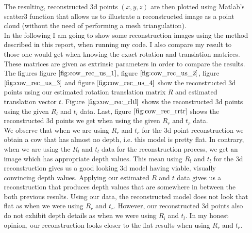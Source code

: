 \documentclass{paper}
\begin{document}
The resulting, reconstructed 3d points $(x,y,z)$ are then plotted using Matlab's scatter3 function that allows us to illustrate a reconstructed image as a point cloud (without the need of performing a mesh triangulation). \\

In the following I am going to show some reconstruction images using the method described in this report, when running my code. I also compare my result to those one would get when knowing the exact rotation and translation matrices. These matrices are given as extrinsic parameters in order to compare the results. \\

The figures figure $\ref{fig:cow_rec_us_1}$, figure $\ref{fig:cow_rec_us_2}$, figure $\ref{fig:cow_rec_us_3}$ and figure $\ref{fig:cow_rec_us_4}$ show the reconstructed 3d points using our estimated rotation translation matrix $R$ and estimated translation vector $t$. Figure $\ref{fig:cow_rec_rltl}$ shows the reconstructed 3d points using the given $R_l$ and $t_l$ data. Last, figure $\ref{fig:cow_rec_rrtr}$ shows the reconstructed 3d points we get when using the given $R_r$ and $t_r$ data. \\

We observe that when we are using $R_r$ and $t_r$ for the 3d point reconstruction we obtain a cow that has almost no depth, i.e. this model is pretty flat. In contrary, when we are using the $R_l$ and $t_l$ data for the reconstruction process, we get an image which has appropriate depth values. This mean using $R_l$ and $t_l$ for the 3d reconstruction gives us a good looking 3d model having viable, visually convincing depth values. Applying our estimated $R$ and $t$ data gives us a reconstruction that produces depth values that are somewhere in between the both previous results. Using our data, the reconstructed model does not look that flat as when we were using $R_r$ and $t_r$. However, our reconstructed 3d points also do not exhibit depth details as when we were using $R_l$ and $t_l$. In my honest opinion, our reconstruction looks closer to the flat results when using $R_r$ and $t_r$. \\
\end{document}
